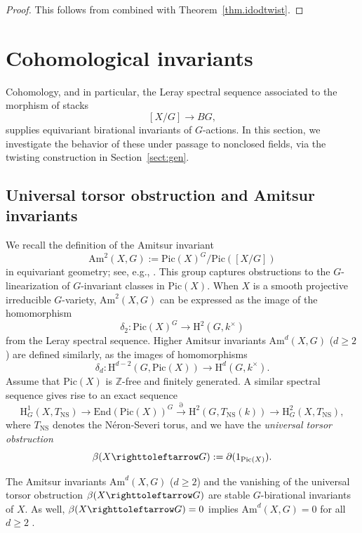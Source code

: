 \documentclass[12pt, reqno]{amsart}
\numberwithin{equation}{section}
\theoremstyle{plain}
\theoremstyle{definition}
\newcommand{\actsfromright}{\righttoleftarrow}
\def\bZ{{\mathbb Z}}
\def\rH{{\mathrm H}}
\def\Pic{\mathrm{Pic}}
\def\End{\mathrm{End}}
\def\Am{\mathrm{Am}}
\begin{document}
\begin{proof}
This follows from \cite[Thm.\ 1.12]{CTP} combined with Theorem~\ref{thm.idodtwist}.
\end{proof}






\section{Cohomological invariants}
\label{sect:coho}

Cohomology, and in particular, the Leray spectral sequence associated to the morphism of stacks
$$
[X/G]\to BG,
$$
supplies equivariant birational invariants of $G$-actions. In this section, we investigate the behavior of these under passage to nonclosed fields, via the twisting construction in Section~\ref{sect:gen}. 





\subsection*{Universal torsor obstruction and Amitsur invariants}
We recall the definition of the Amitsur invariant
$$
\Am^2(X,G):=\Pic(X)^G/\Pic([X/G])
$$
in equivariant geometry; see, e.g., \cite{BCDP}.
This group captures obstructions to the $G$-linearization of $G$-invariant classes in $\Pic(X)$.
When $X$ is a smooth projective irreducible $G$-variety, $\Am^2(X,G)$ can be expressed as the image of the
homomorphism
\[ \delta_2\colon \Pic(X)^G\to \rH^2(G,k^\times) \]
from the Leray spectral sequence.
Higher Amitsur invariants $\Am^d(X,G)$ ($d\ge 2$) are defined similarly, as the images of homomorphisms
\[ 
\delta_d\colon \rH^{d-2}(G,\Pic(X))\to \rH^d(G,k^\times).
\]
Assume that $\Pic(X)$ is $\bZ$-free and finitely generated. 
A similar spectral sequence gives rise to an exact sequence \cite[(3.1)]{KT-uni}
\begin{equation}
\label{eqn.TNSseq}
\rH^1_G(X,T_{\mathrm{NS}})\to 
\End(\Pic(X))^G\stackrel{\partial}\to \rH^2(G,T_{\mathrm{NS}}(k))\to \rH^2_G(X,T_{\mathrm{NS}}),
\end{equation}
where $T_{\mathrm{NS}}$ denotes the N\'eron-Severi torus,
and we have the {\em universal torsor obstruction}
\[ \beta(X\actsfromright G):=\partial(1_{\Pic(X)}). \]

The Amitsur invariants $\Am^d(X,G)$ ($d\ge 2$) and the vanishing of the universal torsor obstruction $\beta(X\actsfromright G)$ are stable $G$-birational invariants of $X$.
As well, $\beta(X\actsfromright G)=0$ implies $\Am^d(X,G)=0$ for all $d\ge 2$ \cite[Thm.\ 1.2]{STZ}.
\end{document}
